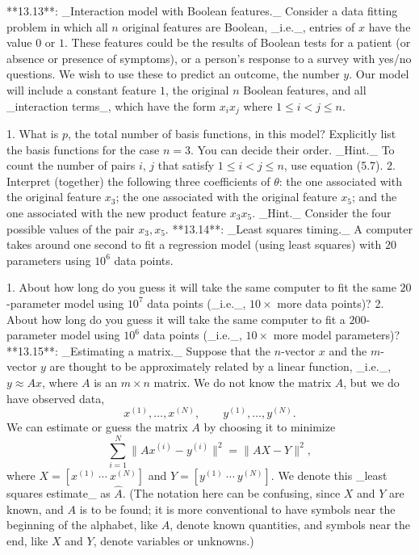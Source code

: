 

**13.13**: _Interaction model with Boolean features._ Consider a data fitting problem in which all \(n\) original features are Boolean, _i.e._, entries of \(x\) have the value \(0\) or \(1\). These features could be the results of Boolean tests for a patient (or absence or presence of symptoms), or a person's response to a survey with yes/no questions. We wish to use these to predict an outcome, the number \(y\). Our model will include a constant feature \(1\), the original \(n\) Boolean features, and all _interaction terms_, which have the form \(x_{i}x_{j}\) where \(1\leq i<j\leq n\).

1. What is \(p\), the total number of basis functions, in this model? Explicitly list the basis functions for the case \(n=3\). You can decide their order. _Hint._ To count the number of pairs \(i\), \(j\) that satisfy \(1\leq i<j\leq n\), use equation (5.7).
2. Interpret (together) the following three coefficients of \(\theta\): the one associated with the original feature \(x_{3}\); the one associated with the original feature \(x_{5}\); and the one associated with the new product feature \(x_{3}x_{5}\). _Hint._ Consider the four possible values of the pair \(x_{3},x_{5}\).
**13.14**: _Least squares timing._ A computer takes around one second to fit a regression model (using least squares) with \(20\) parameters using \(10^{6}\) data points.

1. About how long do you guess it will take the same computer to fit the same \(20\)-parameter model using \(10^{7}\) data points (_i.e._, \(10\times\) more data points)?
2. About how long do you guess it will take the same computer to fit a \(200\)-parameter model using \(10^{6}\) data points (_i.e._, \(10\times\) more model parameters)?
**13.15**: _Estimating a matrix._ Suppose that the \(n\)-vector \(x\) and the \(m\)-vector \(y\) are thought to be approximately related by a linear function, _i.e._, \(y\approx Ax\), where \(A\) is an \(m\times n\) matrix. We do not know the matrix \(A\), but we do have observed data, \[x^{(1)},\ldots,x^{(N)},\qquad y^{(1)},\ldots,y^{(N)}.\] We can estimate or guess the matrix \(A\) by choosing it to minimize \[\sum_{i=1}^{N}\|Ax^{(i)}-y^{(i)}\|^{2}=\|AX-Y\|^{2},\] where \(X=[x^{(1)}\ \cdots\ x^{(N)}]\) and \(Y=[y^{(1)}\ \cdots\ y^{(N)}]\). We denote this _least squares estimate_ as \(\hat{A}\). (The notation here can be confusing, since \(X\) and \(Y\) are known, and \(A\) is to be found; it is more conventional to have symbols near the beginning of the alphabet, like \(A\), denote known quantities, and symbols near the end, like \(X\) and \(Y\), denote variables or unknowns.)

